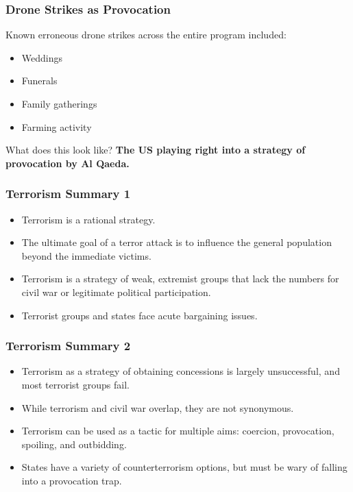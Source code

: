 \documentclass{beamer}
\begin{document}
\begin{frame} 
	\frametitle{\LARGE{Drone Strikes as Provocation}}
Known erroneous drone strikes across the entire program included: \pause
	\begin{itemize}
		\item Weddings \pause
		\item Funerals \pause
		\item Family gatherings \pause
		\item Farming activity \pause
	\end{itemize}
What does this look like? \textbf{The US playing right into a strategy of provocation by Al Qaeda.}
\end{frame}

\begin{frame} 
	\frametitle{\LARGE{Terrorism Summary 1}}
	\begin{itemize}
		\item Terrorism is a rational strategy. \pause
		\item The ultimate goal of a terror attack is to influence the general population beyond the immediate victims. \pause
		\item Terrorism is a strategy of weak, extremist groups that lack the numbers for civil war or legitimate political participation. \pause 
		\item Terrorist groups and states face acute bargaining issues.
	\end{itemize}
\end{frame}

\begin{frame} 
	\frametitle{\LARGE{Terrorism Summary 2}}
	\begin{itemize}
		\item Terrorism as a strategy of obtaining concessions is largely unsuccessful, and most terrorist groups fail. \pause
		\item While terrorism and civil war overlap, they are not synonymous.
		\item Terrorism can be used as a tactic for multiple aims: coercion, provocation, spoiling, and outbidding. \pause
		\item States have a variety of counterterrorism options, but must be wary of falling into a provocation trap.
	\end{itemize}
\end{frame}
\end{document}
